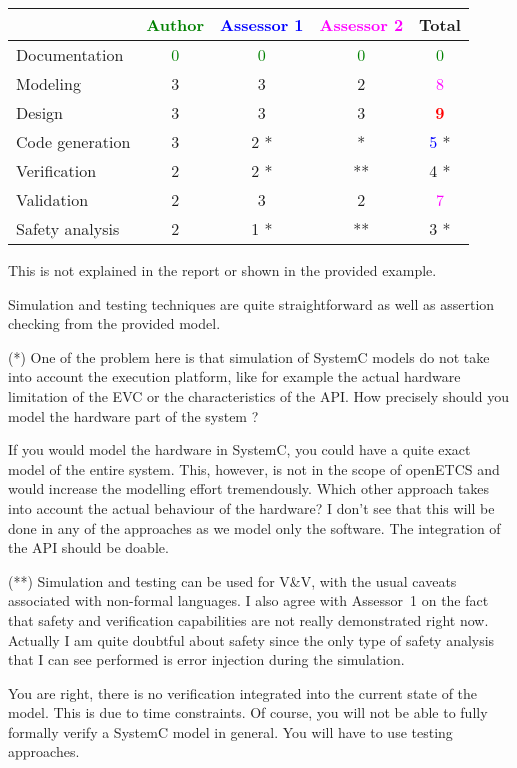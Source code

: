 \begin{tabular}{|l | c | c | c | c|}
\hline
& \textcolor{green}{Author} & \textcolor{blue}{Assessor 1} & \textcolor{magenta}{Assessor 2} & Total \\
\hline
Documentation & \textcolor{green}{0}   & \textcolor{green}{0} & \textcolor{green}{0} & \textcolor{green}{0} \\
\hline
Modeling &3 & 3     & 2     & \textcolor{magenta}{8} \\
\hline
Design &3 &3 & 3     & \textcolor{red}{\textbf{9}} \\
\hline
Code generation &3 & 2     *  & * & \textcolor{blue}{5} * \\
\hline
Verification &2 & 2    * & ** & 4    * \\
\hline
Validation &2 &3 & 2     & \textcolor{magenta}{7} \\
\hline
Safety analysis &2 & 1    * & ** & 3    * \\
\hline
\end{tabular}
\begin{assessor1}
This is not explained in the report or shown in  the provided example.

Simulation and testing techniques are quite straightforward as well as
assertion checking from the provided model.
\end{assessor1}

\begin{assessor2}
  \begin{item}
  \item[(*)] One of the problem here is that simulation of SystemC
    models do not take into account the execution platform, like for
    example the actual hardware limitation of the EVC or the
    characteristics of the API. How precisely should you model the
    hardware part of the system ?
\begin{author_comment}
If you would model the hardware in SystemC, you could have a quite exact model of the entire system. This, however, is not in the scope of openETCS and would increase the modelling effort tremendously. Which other approach takes into account the actual behaviour of the hardware? I don't see that this will be done in any of the approaches as we model only the software. The integration of the API should be doable.
\end{author_comment}
  \item[(**)] Simulation and testing can be used for V\&V, with the
    usual caveats associated with non-formal languages. I also agree
    with Assessor~1 on the fact that safety and verification
    capabilities are not really demonstrated right now. Actually I am
    quite doubtful about safety since the only type of safety analysis
    that I can see performed is error injection during the simulation.
\begin{author_comment}
You are right, there is no verification integrated into the current state of the model. This is due to time constraints. Of course, you will not be able to fully formally verify a SystemC model in general. You will have to use testing approaches.
\end{author_comment}
  \end{item}
\end{assessor2}

